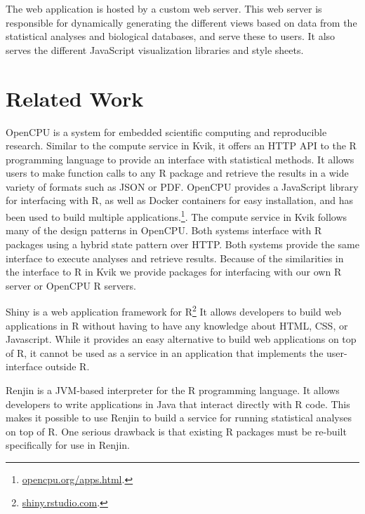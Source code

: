 The web application is hosted by a custom web server. This web server is
responsible for dynamically generating the different views based on data from
the statistical analyses and biological databases, and serve these to users. It
also serves the different JavaScript visualization libraries and style sheets. 

\section{Related Work} 
OpenCPU is a system for embedded scientific computing and reproducible
research.\cite{opencpu} Similar to the compute service in Kvik, it offers an
HTTP API to the R programming language to provide an interface with statistical
methods. It allows users to make function calls to any R package and retrieve
the results in a wide variety of formats such as JSON or PDF. 
OpenCPU provides a JavaScript library for interfacing with R, as well as Docker
containers for easy installation, and has been used to build multiple
applications.\footnote{\url{opencpu.org/apps.html}.}. The compute service in
Kvik follows many of the design patterns in OpenCPU. Both systems interface with
R packages using a hybrid state pattern over HTTP. Both systems provide the same
interface to execute analyses and retrieve results.  Because of the similarities
in the interface to R in Kvik we provide packages for interfacing with our own R
server or OpenCPU R servers.

Shiny is a web application framework for R\footnote{\url{shiny.rstudio.com}.}
It allows developers to build web applications in R without having to have any
knowledge about HTML, CSS, or Javascript. While it provides an easy alternative
to build web applications on top of R, it cannot be used as a service in an
application that implements the user-interface outside R.  

Renjin is a JVM-based interpreter for the R programming language.\cite{renjin}
It allows developers to write applications in Java that interact directly with R
code. This makes it possible to use Renjin to build a service for running
statistical analyses on top of R. One serious drawback is that existing R
packages must be re-built specifically for use in Renjin. 

